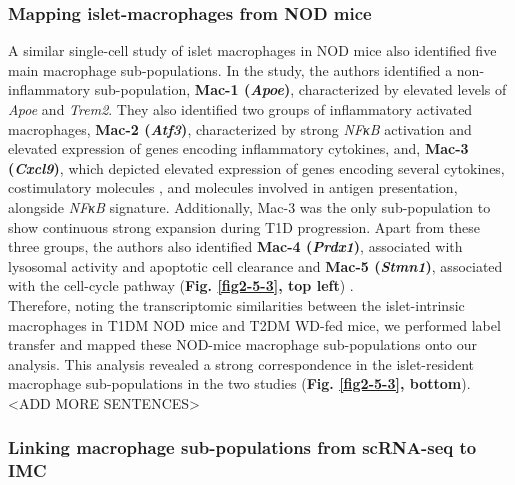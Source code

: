 

\subsubsection{Mapping islet-macrophages from NOD mice}


A similar single-cell study of islet macrophages in NOD mice also identified five main macrophage sub-populations. In the study, the authors identified a non-inflammatory sub-population, \textbf{Mac-1 (\textit{Apoe})}, characterized by elevated levels of \textit{Apoe} and \textit{Trem2}. They also identified two groups of inflammatory activated macrophages, \textbf{Mac-2 (\textit{Atf3})}, characterized by strong \textit{NFκB} activation and elevated expression of genes encoding inflammatory cytokines, and, \textbf{Mac-3 (\textit{Cxcl9})}, which depicted elevated expression of genes encoding several cytokines, costimulatory molecules , and molecules involved in antigen presentation, alongside \textit{NFκB} signature. Additionally, Mac-3 was the only sub-population to show continuous strong expansion during T1D progression. Apart from these three groups, the authors also identified \textbf{Mac-4 (\textit{Prdx1})}, associated with lysosomal activity and apoptotic cell clearance and \textbf{Mac-5 (\textit{Stmn1})}, associated with the cell-cycle pathway (\textbf{Fig. \ref{fig2-5-3}, top left}) \textbf{\cite{zakharov_single-cell_2020}}.  \\

Therefore, noting the transcriptomic similarities between the islet-intrinsic macrophages in T1DM NOD mice and T2DM WD-fed mice, we performed label transfer and mapped these NOD-mice macrophage sub-populations onto our analysis. This analysis revealed a strong correspondence in the islet-resident macrophage sub-populations in the two studies (\textbf{Fig. \ref{fig2-5-3}, bottom}). <ADD MORE SENTENCES>



\subsubsection{Linking macrophage sub-populations from scRNA-seq to IMC}

